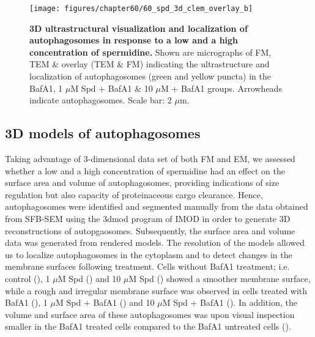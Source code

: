 \begin{landscape}
\begin{figure}[!htbp]
\vspace{1.2cm}
\center
 \texttt{[image: figures/chapter60/60\_spd\_3d\_clem\_overlay\_b]}
 \caption[3D ultrastructural visualization and localization of autophagosomes in response to a low and a high concentration of spermidine]{\textbf{3D ultrastructural visualization and localization of autophagosomes in response to a low and a high concentration of spermidine.} Shown are micrographs of FM, TEM \& overlay (TEM \& FM) indicating the ultrastructure and localization of autophagosomes (green and yellow puncta) in the BafA1, 1 $\mu$M Spd + BafA1 \& 10 $\mu$M + BafA1 groups. Arrowheads indicate autophagosomes. Scale bar: 2 $\mu$m.}
 \label{fig:60_spd_3d_clem_overlay_b}
\end{figure} 
\end{landscape}

\subsection{3D models of autophagosomes}
Taking advantage of 3-dimensional data set of both FM and EM, we assessed whether a low and a high concentration of spermidine had an effect on the surface area and volume of autophagosomes, providing indications of size regulation but also capacity of proteinaceous cargo clearance. Hence, autophagosomes were identified and segmented manually from the data obtained from SFB-SEM using the 3dmod program of IMOD \citep{Kremer1996} in order to generate 3D reconstructions of autopgaosomes. Subsequently, the surface area and volume data was generated from rendered models. The resolution of the models allowed us to localize autophagosomes in the cytoplasm and to detect changes in the membrane surfaces following treatment. Cells without BafA1 treatment; i.e. control (), 1 $\mu$M Spd () and 10 $\mu$M Spd () showed a smoother membrane surface, while a rough and irregular membrane surface was observed in cells treated with BafA1 (), 1 $\mu$M Spd + BafA1 () and 10 $\mu$M Spd + BafA1 (). In addition, the volume and surface area of these autophagosomes was upon visual inspection smaller in the BafA1 treated cells compared to the BafA1 untreated cells ().

